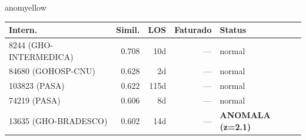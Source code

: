 \documentclass[a4paper,10pt]{article}
\begin{document}
\begin{anomalycard}[Internacao 133861 | GHO-PETROBRAS | MODERADO (z=2.07)]{anomyellow}
\begin{tabular}{l r r r l}\toprule\textbf{Intern.} & \textbf{Simil.} & \textbf{LOS} & \textbf{Faturado} & \textbf{Status} \\\midrule
8244 (GHO-INTERMEDICA) & 0.708 & 10d & --- & \textcolor{jcubeblue}{normal} \\
84680 (GOHOSP-CNU) & 0.628 & 2d & --- & \textcolor{jcubeblue}{normal} \\
103823 (PASA) & 0.622 & 115d & --- & \textcolor{jcubeblue}{normal} \\
74219 (PASA) & 0.606 & 8d & --- & \textcolor{jcubeblue}{normal} \\
13635 (GHO-BRADESCO) & 0.602 & 14d & --- & \textcolor{anomred}{\textbf{ANOMALA (z=2.1)}} \\
\bottomrule\end{tabular}


\end{anomalycard}

\newpage
\end{document}
